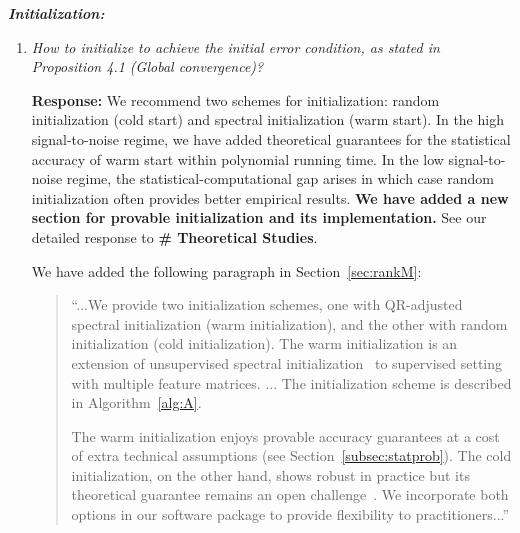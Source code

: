 \documentclass[11pt]{article}
\theoremstyle{plain}
\theoremstyle{definition}
\begin{document}
\vspace{0.2cm}
\textit{\textbf{Initialization:}}
\begin{enumerate}[wide, labelwidth=!, labelindent=0pt]
    \item \textit{How to initialize to achieve the initial error condition, as stated in Proposition 4.1 (Global convergence)?}
    
    {\bf Response:} We recommend two schemes for initialization: random initialization (cold start) and spectral initialization (warm start). In the high signal-to-noise regime, we have added theoretical guarantees for the statistical accuracy of warm start within polynomial running time. In the low signal-to-noise regime, the statistical-computational gap arises in which case random initialization often provides better empirical results. {\bf We have added a new section for provable initialization and its implementation.} See our detailed response to  {\bf\# Theoretical Studies}.    
    
    We have added the following paragraph in Section~\ref{sec:rankM}:
    \begin{quote}
    ``...We provide two initialization schemes, one with QR-adjusted spectral initialization (warm initialization), and the other with random initialization (cold initialization). The warm initialization is an extension of unsupervised spectral initialization~\citep{zhang2018tensor} to supervised setting with multiple feature matrices. ... The initialization scheme is described in Algorithm~\ref{alg:A}. 

The warm initialization enjoys provable accuracy guarantees at a cost of extra technical assumptions (see Section~\ref{subsec:statprob}). The cold initialization, on the other hand, shows robust in practice but its theoretical guarantee remains an open challenge~\citep{luo2021low}. We incorporate both options in our software package to provide flexibility to practitioners...''
\end{quote}


\end{enumerate}
\end{document}
